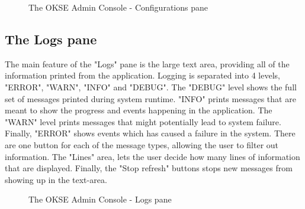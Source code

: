\begin{center}
  \begin{figure}[ht!]
    \caption{The OKSE Admin Console - Configurations pane} 
    \label{fig:OKSE Admin Console - Configurations pane}
  \end{figure}
\end{center}

\subsection{The Logs pane}
The main feature of the "Logs" pane is the large text area, providing all of the information printed from the application. Logging is separated into 4 levels, "ERROR", "WARN", "INFO" and "DEBUG". The "DEBUG" level shows the full set of messages printed during system runtime. "INFO" prints messages that are meant to show the progress and events happening in the application. The "WARN" level prints messages that might potentially lead to system failure. Finally, "ERROR" shows events which has caused a failure in the system. There are one button for each of the message types, allowing the user to filter out information. The "Lines" area, lets the user decide how many lines of information that are displayed. Finally, the "Stop refresh" buttons stops new messages from showing up in the text-area.

\begin{center}
  \begin{figure}[ht!]
    \caption{The OKSE Admin Console - Logs pane} 
    \label{fig:OKSE Admin Console - Logs pane}
  \end{figure}
\end{center}

